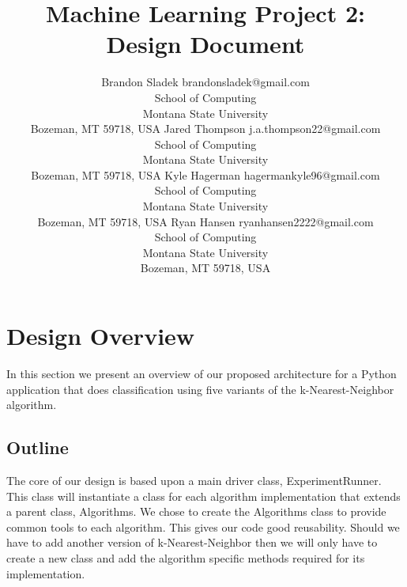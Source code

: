 \documentclass[twoside,11pt]{article}
\begin{document}
\title{Machine Learning Project 2: Design Document}

\author{\name Brandon Sladek \email 
      brandonsladek@gmail.com \\ \addr School of Computing\\ Montana State University\\
       Bozeman, MT 59718, USA
        \AND
        \name Jared Thompson \email j.a.thompson22@gmail.com \\ \addr School of Computing\\ Montana State University\\
       Bozeman, MT 59718, USA
        \AND
        \name Kyle Hagerman \email hagermankyle96@gmail.com \\ \addr School of Computing\\ Montana State University\\
       Bozeman, MT 59718, USA
        \AND
        \name Ryan Hansen \email ryanhansen2222@gmail.com \\ \addr School of Computing\\ Montana State University\\
       Bozeman, MT 59718, USA}
       

\maketitle

\section{Design Overview}

In this section we present an overview of our proposed architecture for a Python application that does classification using five variants of the k-Nearest-Neighbor algorithm.

    \subsection{Outline}
    The core of our design is based upon a main driver class, ExperimentRunner. This class will instantiate a class for each algorithm implementation that extends a parent class, Algorithms. We chose to create the Algorithms class to provide common tools to each algorithm. This gives our code good reusability. Should we have to add another version of k-Nearest-Neighbor then we will only have to create a new class and add the algorithm specific methods required for its implementation.
    
\end{document}
